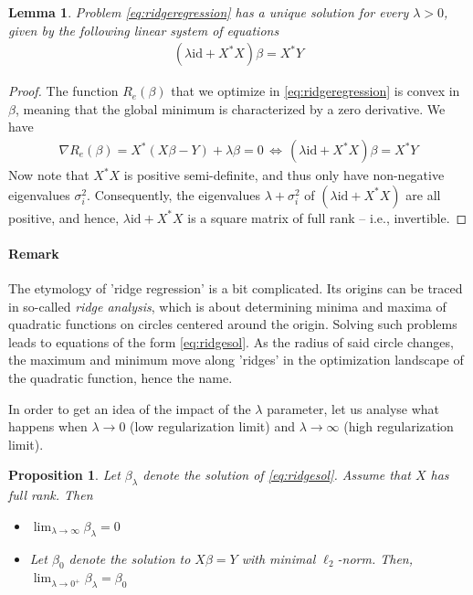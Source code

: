 \documentclass{article}
\newcommand{\id}{\mathrm{id}}
\newtheorem{lemma}{Lemma}
\newtheorem{prop}{Proposition}
\begin{document}
\begin{lemma}
    Problem \ref{eq:ridgeregression} has a unique solution for every $\lambda>0$, given by the following linear system of equations
    \begin{align}
        (\lambda \id + X^*X)\beta = X^*Y \label{eq:ridgesol}
    \end{align}
\end{lemma}
\begin{proof} The function $R_e(\beta)$ that we optimize in \eqref{eq:ridgeregression} is convex in $\beta$, meaning that the global minimum is characterized by a zero derivative. We have
\begin{align*}
    \nabla R_e(\beta) = X^*(X\beta-Y) + \lambda \beta = 0 \, \Leftrightarrow \, (\lambda \id + X^*X)\beta = X^*Y
\end{align*}
Now note that $X^*X$ is positive semi-definite, and thus only have non-negative eigenvalues $\sigma_i^2$. Consequently, the eigenvalues $\lambda + \sigma_i^2$ of $(\lambda\id + X^*X)$ are all positive, and hence, $\lambda \id + X^*X$ is a square matrix of full rank -- i.e., invertible.
\end{proof}

\paragraph{Remark} The etymology of 'ridge regression' is a bit complicated. Its origins can be traced in so-called \emph{ridge analysis}, which  is about determining minima and maxima of quadratic functions on circles centered around the origin. Solving such problems leads to equations of the form \eqref{eq:ridgesol}. As the radius of said circle changes, the maximum and minimum move along 'ridges' in the optimization landscape of the quadratic function, hence the name. \cite{hoerl2020ridge}

In order to get an idea of the impact of the $\lambda$ parameter, let us analyse what happens when $\lambda\to 0$ (low regularization limit) and $\lambda \to \infty$ (high regularization limit).

\begin{prop}
    Let $\beta_\lambda$ denote the solution of \eqref{eq:ridgesol}. Assume that $X$ has full rank. Then
    \begin{itemize}
        \item $\lim_{\lambda \to \infty} \beta_\lambda = 0$
        \item  Let $\beta_0$ denote the solution to $X\beta =Y$ with minimal $\ell_2$-norm. Then, $\lim_{\lambda \to 0^+} \beta_\lambda=\beta_0$
    \end{itemize}
\end{prop}
\end{document}
